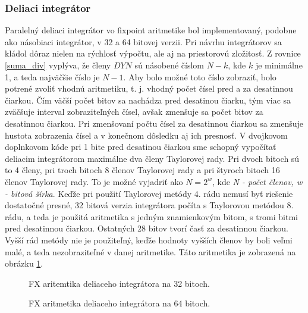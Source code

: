 \subsubsection*{Deliaci integrátor}

Paralelný deliaci integrátor vo fixpoint aritmetike bol implementovaný, podobne ako násobiaci integrátor, v 32 a 64 bitovej verzii. Pri návrhu integrátorov sa kládol dôraz nielen na rýchlosť výpočtu, ale aj na priestorovú zložitosť. 
Z rovnice \eqref{suma_div} vyplýva, že členy $ DYN $ sú násobené číslom $ N-k $, kde $ k $ je minimálne 1, a teda najväčšie číslo je $ N-1 $. Aby bolo možné toto číslo zobraziť, bolo potrené zvoliť vhodnú aritmetiku, t. j. vhodný počet čísel pred a za desatinnou čiarkou. Čím väčší počet bitov sa nachádza pred desatinou čiarku, tým viac sa zväčšuje interval zobraziteľných čísel, avšak zmenšuje sa počet bitov za desatinnou čiarkou. Pri zmenšovaní počtu čísel za desatinnou čiarkou sa zmenšuje hustota zobrazenia čísel a v konečnom dôsledku aj ich presnosť. V dvojkovom doplnkovom kóde pri 1 bite pred desatinou čiarkou sme schopný vypočítať deliacim integrátorom maximálne dva členy Taylorovej rady. Pri dvoch bitoch sú to 4 členy, pri troch bitoch 8 členov Taylorovej rady a pri štyroch bitoch 16 členov Taylorovej rady. To je možné vyjadriť ako $ N = 2^{w} $, kde \textit{N - počet členov, w - bitová šírka}. Keďže pri použití Taylorovej metódy 4. rádu nemusí byť riešenie dostatočné presné, 32 bitová verzia integrátora počíta s Taylorovou metódou 8. rádu, a teda je použitá aritmetika s jedným znamienkovým bitom, s tromi bitmi pred desatinnou čiarkou. Ostatných 28 bitov tvorí časť za desatinnou čiarkou. Vyšší rád metódy nie je použiteľný, keďže hodnoty vyšších členov by boli veľmi malé, a teda nezobraziteľné v danej aritmetike. Táto aritmetika je zobrazená na obrázku \ref{fxdivaritmetic32}.

\bigskip
\begin{figure}[h]
\centering
{}
\caption{FX aritemtika deliaceho integrátora na 32 bitoch.}
\label{fxdivaritmetic32}
\end{figure}
\bigskip


\bigskip
\begin{figure}[h]
\centering
{}
\caption{FX aritmetika deliaceho integrátora na 64 bitoch.}
\label{fxdivaritmetic64}
\end{figure}
\bigskip

